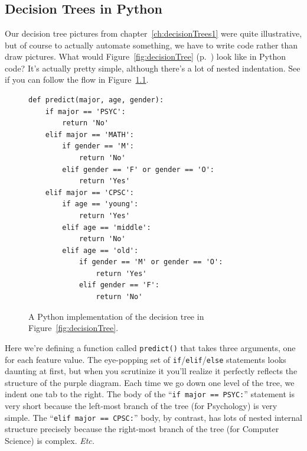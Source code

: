

\chapter[Decision trees (2 of 2)]{\huge\selectfont{Decision
trees for classification (2 of 2)}}
\label{ch:decisionTrees2}

\smallskip
\section{Decision Trees in Python}


Our decision tree pictures from chapter~\ref{ch:decisionTrees1} were quite
illustrative, but of course to actually automate something, we have to write
code rather than draw pictures. What would Figure~\ref{fig:decisionTree}
(p.~\pageref{fig:decisionTree}) look like in Python code? It's actually pretty
simple, although there's a lot of nested indentation. See if you can follow the
flow in Figure~\ref{fig:pythonDT}.

\begin{figure}[h]
\centering
\begin{Verbatim}[fontsize=\footnotesize,samepage=true,frame=single,framesep=3mm,xleftmargin=1cm,xrightmargin=1cm]
def predict(major, age, gender):
    if major == 'PSYC':
        return 'No'
    elif major == 'MATH':
        if gender == 'M':
            return 'No'
        elif gender == 'F' or gender == 'O':
            return 'Yes'
    elif major == 'CPSC':
        if age == 'young':
            return 'Yes'
        elif age == 'middle':
            return 'No'
        elif age == 'old':
            if gender == 'M' or gender == 'O':
                return 'Yes'
            elif gender == 'F':
                return 'No'
\end{Verbatim}
\caption{A Python implementation of the decision tree in
Figure~\ref{fig:decisionTree}.}
\label{fig:pythonDT}
\end{figure}


Here we're defining a function called \texttt{predict()} that takes three
arguments, one for each feature value. The eye-popping set of
\texttt{if}/\texttt{elif}/\texttt{else} statements looks daunting at first, but
when you scrutinize it you'll realize it perfectly reflects the structure of
the purple diagram. Each time we go down one level of the tree, we indent one
tab to the right. The body of the ``\texttt{if major == \textquotesingle
PSYC\textquotesingle :}'' statement is very short because the left-most branch
of the tree (for Psychology) is very simple. The ``\texttt{elif major ==
\textquotesingle CPSC\textquotesingle :}'' body, by contrast, has lots of
nested internal structure precisely because the right-most branch of the tree
(for Computer Science) is complex. \textit{Etc.}

